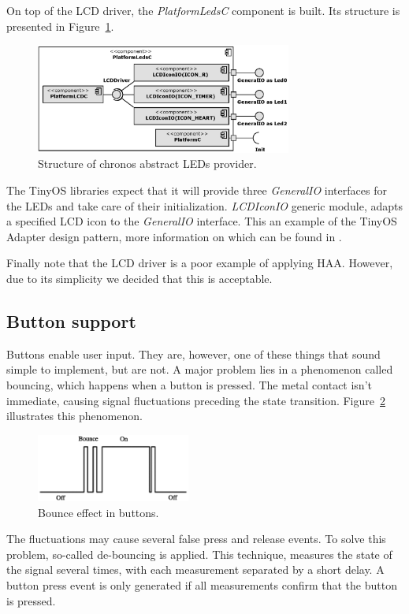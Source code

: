 On top of the LCD driver, the \emph{PlatformLedsC} component is built. Its structure is presented in Figure~\ref{fig:platform_leds_c}.
\begin{figure}[h]
  \centering
  \includegraphics[width=0.75\textwidth]{diagrams/platform_leds_c.eps}
  \caption{Structure of chronos abstract LEDs provider.}
  \label{fig:platform_leds_c}
\end{figure}
The TinyOS libraries expect that it will provide three \emph{GeneralIO} interfaces for the LEDs and take care of their initialization. \emph{LCDIconIO} generic module, adapts a specified LCD icon to the \emph{GeneralIO} interface. This an example of the TinyOS Adapter design pattern, more information on which can be found in \cite[ch. 8]{TOSProg}.

Finally note that the LCD driver is a poor example of applying HAA. However, due to its simplicity we decided that this is acceptable.

\subsection{Button support}

Buttons enable user input. They are, however, one of these things that sound simple to implement, but are not. A major problem lies in a phenomenon called bouncing, which happens when a button is pressed. The metal contact isn't immediate, causing signal fluctuations preceding the state transition. Figure~\ref{fig:bouncing} illustrates this phenomenon.

\begin{figure}[h]
  \centering
  \includegraphics[width=0.45\textwidth]{img/Bounce.eps}
  \caption{Bounce effect in buttons.}
  \label{fig:bouncing}
\end{figure}
The fluctuations may cause several false press and release events. To solve this problem, so-called de-bouncing is applied. This technique, measures the state of the signal several times, with each measurement separated by a short delay. A button press event is only generated if all measurements confirm that the button is pressed.

